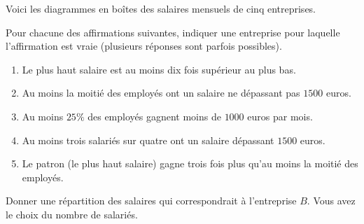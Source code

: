 
\begin{exercice}\label{exosmath-0249}

    Voici les diagrammes en boîtes des salaires mensuels de cinq entreprises. 

    \begin{center}

    \end{center}

Pour chacune des affirmations suivantes, indiquer une entreprise pour laquelle l'affirmation est vraie (plusieurs réponses sont parfois possibles).
\begin{enumerate}
    \item
        Le plus haut salaire est au moins dix fois supérieur au plus bas.
    \item
        Au moins la moitié des employés ont un salaire ne dépassant pas \( 1500\) euros.
    \item
        Au moins \( 25\%\) des employés gagnent moins de \( 1000\) euros par mois.
    \item
        Au moins trois salariés sur quatre ont un salaire dépassant \( 1500\) euros.
    \item
        Le patron (le plus haut salaire) gagne trois fois plus qu'au moins la moitié des employés.
\end{enumerate}

Donner une répartition des salaires qui correspondrait à l'entreprise \( B\). Vous avez le choix du nombre de salariés.

\end{exercice}
